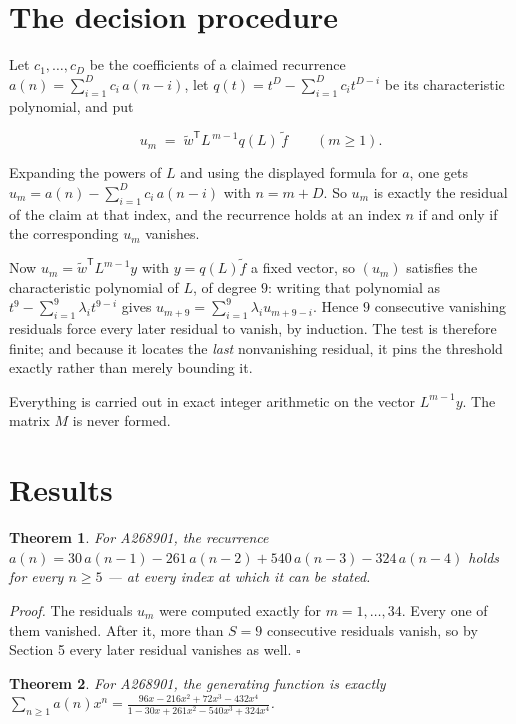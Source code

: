 \documentclass[11pt]{article}
\newtheorem{theorem}{Theorem}
\theoremstyle{definition}
\begin{document}
\section{The decision procedure}

Let $c_1,\dots,c_D$ be the coefficients of a claimed recurrence $a(n) = \sum_{i=1}^{D} c_i\,a(n-i)$, let $q(t) = t^{D} - \sum_{i=1}^{D} c_i t^{D-i}$ be its characteristic polynomial, and put

\[u_m \;=\; \tilde w^{\mathsf T} L^{\,m-1} q(L)\,\tilde f \qquad (m \ge 1).\]

Expanding the powers of $L$ and using the displayed formula for $a$, one gets $u_m = a(n) - \sum_{i=1}^{D} c_i\,a(n-i)$ with $n = m + D$. So $u_m$ is exactly the residual of the claim at that index, and the recurrence holds at an index $n$ if and only if the corresponding $u_m$ vanishes.

Now $u_m = \tilde w^{\mathsf T} L^{m-1} y$ with $y = q(L)\tilde f$ a fixed vector, so $(u_m)$ satisfies the characteristic polynomial of $L$, of degree $9$: writing that polynomial as $t^{9} - \sum_{i=1}^{9} \lambda_i t^{9-i}$ gives $u_{m+9} = \sum_{i=1}^{9} \lambda_i u_{m+9-i}$. Hence $9$ consecutive vanishing residuals force every later residual to vanish, by induction. The test is therefore finite; and because it locates the {\itshape last} nonvanishing residual, it pins the threshold exactly rather than merely bounding it.

Everything is carried out in exact integer arithmetic on the vector $L^{m-1}y$. The matrix $M$ is never formed.

\section{Results}

\begin{theorem} For A268901, the recurrence $a(n) = 30\,a(n-1) - 261\,a(n-2) + 540\,a(n-3) - 324\,a(n-4)$ holds for every $n \ge 5$ --- at every index at which it can be stated.\end{theorem}

{\itshape Proof.} The residuals $u_m$ were computed exactly for $m = 1,\dots,34$. Every one of them vanished. After it, more than $S = 9$ consecutive residuals vanish, so by Section 5 every later residual vanishes as well. $\square$

\begin{theorem} For A268901, the generating function is exactly $\sum_{n\ge 1} a(n)x^n = \frac{96x - 216x^{2} + 72x^{3} - 432x^{4}}{1 - 30x + 261x^{2} - 540x^{3} + 324x^{4}}$.\end{theorem}
\end{document}
